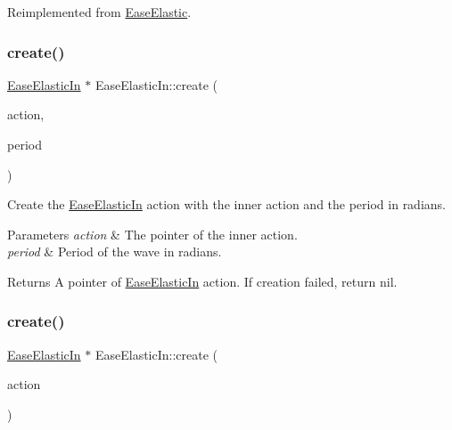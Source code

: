 Reimplemented from \hyperlink{classEaseElastic_a72d5dc8a380dbb00e68c1d7c80258d28}{Ease\+Elastic}.

\mbox{\label{classEaseElasticIn_a1c7f329121d30b9ade15e919ed180fb2}} 
\subsubsection{\texorpdfstring{create()}{create()}\hspace{0.1cm}{\footnotesize\ttfamily [1/2]}}
{\footnotesize\ttfamily \hyperlink{classEaseElasticIn}{Ease\+Elastic\+In} $\ast$ Ease\+Elastic\+In\+::create (\begin{DoxyParamCaption}\item[{\hyperlink{classActionInterval}{Action\+Interval} $\ast$}]{action,  }\item[{float}]{period }\end{DoxyParamCaption})\hspace{0.3cm}{\ttfamily [static]}}



Create the \hyperlink{classEaseElasticIn}{Ease\+Elastic\+In} action with the inner action and the period in radians. 


\begin{DoxyParams}{Parameters}
{\em action} & The pointer of the inner action. \\
\hline
{\em period} & Period of the wave in radians. \\
\hline
\end{DoxyParams}
\begin{DoxyReturn}{Returns}
A pointer of \hyperlink{classEaseElasticIn}{Ease\+Elastic\+In} action. If creation failed, return nil. 
\end{DoxyReturn}
\mbox{\label{classEaseElasticIn_ab1d314a00b5b44e4c150988048662367}} 
\subsubsection{\texorpdfstring{create()}{create()}\hspace{0.1cm}{\footnotesize\ttfamily [2/2]}}
{\footnotesize\ttfamily \hyperlink{classEaseElasticIn}{Ease\+Elastic\+In} $\ast$ Ease\+Elastic\+In\+::create (\begin{DoxyParamCaption}\item[{\hyperlink{classActionInterval}{Action\+Interval} $\ast$}]{action }\end{DoxyParamCaption})\hspace{0.3cm}{\ttfamily [static]}}



